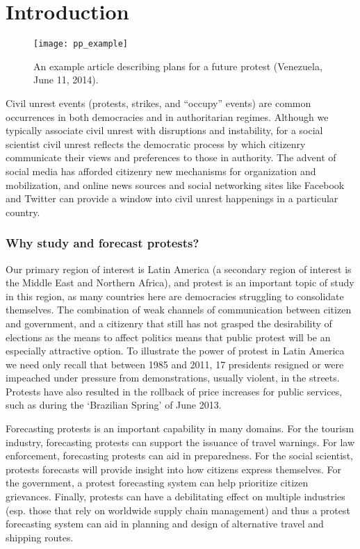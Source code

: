 \section{Introduction}
\begin{figure}
    \texttt{[image: pp\_example]}
    \caption{An example article describing plans for a future protest (Venezuela, June 11, 2014).}
    \label{pp_example}
    \vspace{-2em}
\end{figure}
Civil unrest events (protests, strikes, and ``occupy'' events) are common occurrences in both democracies
and in authoritarian regimes.
Although we typically associate civil unrest with disruptions and instability, for a social scientist
civil unrest reflects the democratic process by 
which citizenry communicate their views and preferences to those in authority. 
The advent of social
media has afforded citizenry new mechanisms for organization and mobilization, and online news sources
and social networking sites like Facebook and Twitter
can provide a window into civil unrest happenings in a particular country.

\subsubsection{Why study and forecast protests?}
Our primary region of interest is Latin America ({\color{red}a secondary
region of interest is the Middle East and Northern Africa}), and protest is an important topic of study in this region, 
as many countries here are democracies struggling to consolidate themselves. The combination of weak channels of communication 
between citizen and government, and a citizenry that still has not grasped the desirability of elections as the means to affect politics 
means that public protest will be an especially attractive option. To 
illustrate the power of protest in Latin America we need only recall 
that between 1985 and 2011, 17 presidents resigned or were impeached under pressure from demonstrations, usually violent, in the streets. Protests have 
also resulted in the rollback of price increases for public services, such as during the ‘Brazilian Spring’ of June 2013.

Forecasting protests is an important capability in many domains.
For the tourism industry, forecasting protests can
support the issuance of travel warnings. For law enforcement,
forecasting protests can aid in preparedness. For the social scientist,
protests forecasts will provide insight into how citizens express themselves.
For the government, a protest forecasting system can help prioritize
citizen grievances. Finally, protests can have a debilitating effect on
multiple industries (esp. those that rely on worldwide supply chain management)
and thus a protest forecasting system can aid in planning and design
of alternative travel and shipping routes.

